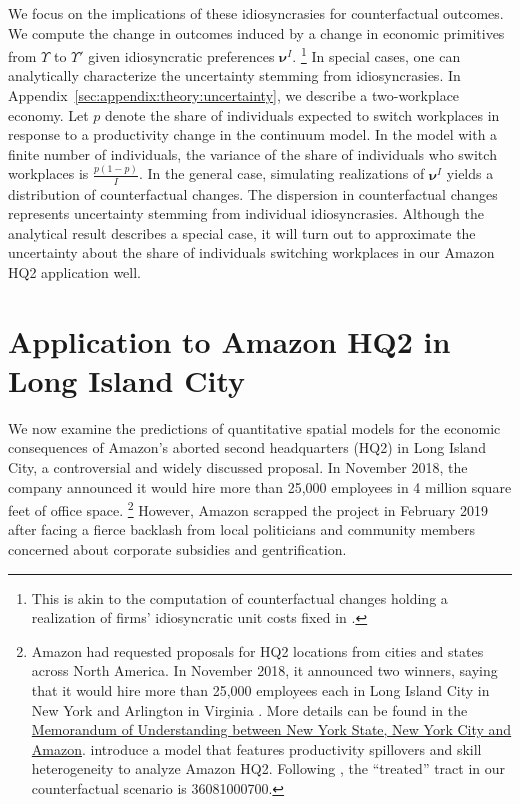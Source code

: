 \documentclass[11pt]{article}
\theoremstyle{definition}
\newcommand\idiosyncraticphrase{idiosyncratic preference}
\begin{document}
We focus on the implications of these idiosyncrasies for counterfactual outcomes.
We compute the change in outcomes induced by a change in economic primitives from $\Upsilon$ to $\Upsilon'$ 
given \idiosyncraticphrase s $\boldsymbol \nu^{I}$.%
\footnote{
	This is akin to the computation of counterfactual changes holding a realization of firms' idiosyncratic unit costs fixed in \citet[Section 6.1]{EatonKortumSotelo:2013}.
}
In special cases, one can analytically characterize the uncertainty stemming from idiosyncrasies.
In Appendix~\ref{sec:appendix:theory:uncertainty}, we describe a two-workplace economy.
Let $p$ denote the share of individuals expected to switch workplaces in response to a productivity change in the continuum model.
In the model with a finite number of individuals, the variance of the share of individuals who switch workplaces is $\frac{p(1-p)}{I}$.
In the general case, simulating realizations of $\boldsymbol \nu^{I}$ yields a distribution of counterfactual changes.
The dispersion in counterfactual changes represents uncertainty stemming from individual idiosyncrasies.
Although the analytical result describes a special case,
it will turn out to approximate the uncertainty about the share of individuals switching workplaces in our Amazon HQ2 application well.\section{Application to Amazon HQ2 in Long Island City}\label{sec:AmazonHQ2}

We now examine the predictions of quantitative spatial models for the
economic consequences of
Amazon's aborted second headquarters (HQ2) in Long Island City,
a controversial and widely discussed proposal.
In November 2018, the company announced
it would hire more than 25,000 employees in 4 million square feet of office space.%
\footnote{
	Amazon 
	had requested proposals for HQ2 locations from cities and states across North America.
	In November 2018, it announced two winners,
	saying that it would hire
	more than 25,000 employees each in Long Island City in New York and Arlington in Virginia \citep{Amazon:2018}.
	More details can be found in the \href{https://d39w7f4ix9f5s9.cloudfront.net/4d/db/a54a9d6c4312bb171598d0b2134c/new-york-agreement.pdf}{Memorandum of Understanding between New York State, New York City and Amazon}.
	\cite{BerkesGaetani:2020} introduce a model that features productivity spillovers and skill heterogeneity to analyze Amazon HQ2.
	Following \cite{BerkesGaetani:2020}, the ``treated'' tract in our counterfactual scenario is 36081000700.
}
However, Amazon scrapped the project in February 2019 after facing a fierce backlash from local politicians and community members concerned about corporate subsidies and gentrification.
\end{document}
